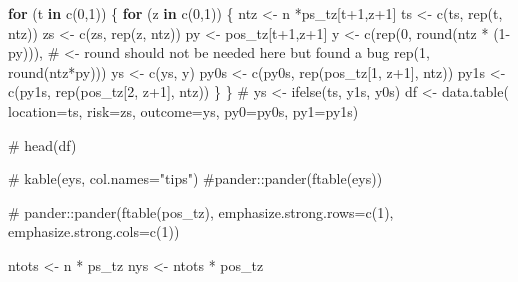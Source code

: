 \documentclass[
  letterpaper,
  DIV=11,
  numbers=noendperiod]{scrartcl}
\newenvironment{Shaded}{\begin{snugshade}}{\end{snugshade}}
\newcommand{\AttributeTok}[1]{\textcolor[rgb]{0.40,0.45,0.13}{#1}}
\newcommand{\CommentTok}[1]{\textcolor[rgb]{0.37,0.37,0.37}{#1}}
\newcommand{\ControlFlowTok}[1]{\textcolor[rgb]{0.00,0.23,0.31}{\textbf{#1}}}
\newcommand{\DecValTok}[1]{\textcolor[rgb]{0.68,0.00,0.00}{#1}}
\newcommand{\FunctionTok}[1]{\textcolor[rgb]{0.28,0.35,0.67}{#1}}
\newcommand{\NormalTok}[1]{\textcolor[rgb]{0.00,0.23,0.31}{#1}}
\newcommand{\OtherTok}[1]{\textcolor[rgb]{0.00,0.23,0.31}{#1}}
\newcommand{\SpecialCharTok}[1]{\textcolor[rgb]{0.37,0.37,0.37}{#1}}
\begin{document}
\begin{Shaded}
\begin{Highlighting}[]
\ControlFlowTok{for}\NormalTok{ (t }\ControlFlowTok{in} \FunctionTok{c}\NormalTok{(}\DecValTok{0}\NormalTok{,}\DecValTok{1}\NormalTok{)) \{}
  \ControlFlowTok{for}\NormalTok{ (z }\ControlFlowTok{in} \FunctionTok{c}\NormalTok{(}\DecValTok{0}\NormalTok{,}\DecValTok{1}\NormalTok{)) \{}
\NormalTok{    ntz }\OtherTok{\textless{}{-}}\NormalTok{ n }\SpecialCharTok{*}\NormalTok{ps\_tz[t}\SpecialCharTok{+}\DecValTok{1}\NormalTok{,z}\SpecialCharTok{+}\DecValTok{1}\NormalTok{]}
\NormalTok{    ts  }\OtherTok{\textless{}{-}} \FunctionTok{c}\NormalTok{(ts, }\FunctionTok{rep}\NormalTok{(t, ntz))}
\NormalTok{    zs  }\OtherTok{\textless{}{-}} \FunctionTok{c}\NormalTok{(zs, }\FunctionTok{rep}\NormalTok{(z, ntz))}
\NormalTok{    py }\OtherTok{\textless{}{-}}\NormalTok{ pos\_tz[t}\SpecialCharTok{+}\DecValTok{1}\NormalTok{,z}\SpecialCharTok{+}\DecValTok{1}\NormalTok{]}
\NormalTok{    y }\OtherTok{\textless{}{-}} \FunctionTok{c}\NormalTok{(}\FunctionTok{rep}\NormalTok{(}\DecValTok{0}\NormalTok{,}
               \FunctionTok{round}\NormalTok{(ntz }\SpecialCharTok{*}\NormalTok{ (}\DecValTok{1}\SpecialCharTok{{-}}\NormalTok{py))), }\CommentTok{\# \textless{}{-} round should not be needed here but found a bug}
           \FunctionTok{rep}\NormalTok{(}\DecValTok{1}\NormalTok{,}
               \FunctionTok{round}\NormalTok{(ntz}\SpecialCharTok{*}\NormalTok{py))) }
\NormalTok{    ys }\OtherTok{\textless{}{-}} \FunctionTok{c}\NormalTok{(ys, y)}
\NormalTok{    py0s }\OtherTok{\textless{}{-}} \FunctionTok{c}\NormalTok{(py0s, }\FunctionTok{rep}\NormalTok{(pos\_tz[}\DecValTok{1}\NormalTok{, z}\SpecialCharTok{+}\DecValTok{1}\NormalTok{], ntz))}
\NormalTok{    py1s }\OtherTok{\textless{}{-}} \FunctionTok{c}\NormalTok{(py1s, }\FunctionTok{rep}\NormalTok{(pos\_tz[}\DecValTok{2}\NormalTok{, z}\SpecialCharTok{+}\DecValTok{1}\NormalTok{], ntz))}
\NormalTok{  \}}
\NormalTok{\}}
\CommentTok{\# ys \textless{}{-} ifelse(ts, y1s, y0s)}
\NormalTok{df }\OtherTok{\textless{}{-}} \FunctionTok{data.table}\NormalTok{(}
  \AttributeTok{location=}\NormalTok{ts,}
  \AttributeTok{risk=}\NormalTok{zs,}
  \AttributeTok{outcome=}\NormalTok{ys,}
  \AttributeTok{py0=}\NormalTok{py0s,}
  \AttributeTok{py1=}\NormalTok{py1s)}

\CommentTok{\# head(df)}

\CommentTok{\# kable(eys, col.names="tips")}
\CommentTok{\#pander::pander(ftable(eys))}

\CommentTok{\# pander::pander(ftable(pos\_tz), emphasize.strong.rows=c(1), emphasize.strong.cols=c(1))}

\NormalTok{ntots }\OtherTok{\textless{}{-}}\NormalTok{ n }\SpecialCharTok{*}\NormalTok{ ps\_tz}
\NormalTok{nys }\OtherTok{\textless{}{-}}\NormalTok{ ntots }\SpecialCharTok{*}\NormalTok{ pos\_tz}


\end{Highlighting}
\end{Shaded}
\end{document}
